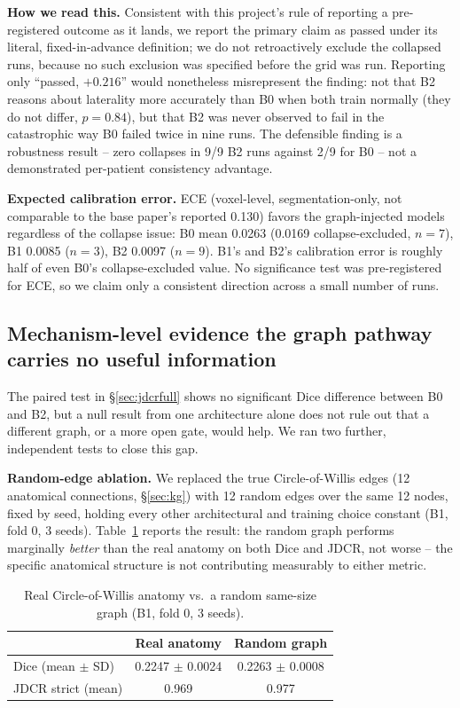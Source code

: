 \documentclass[conference]{IEEEtran}
\begin{document}
\textbf{How we read this.} Consistent with this project's rule of reporting a pre-registered outcome as it lands, we report the primary claim as passed under its literal, fixed-in-advance definition; we do not retroactively exclude the collapsed runs, because no such exclusion was specified before the grid was run. Reporting only ``passed, $+0.216$'' would nonetheless misrepresent the finding: not that B2 reasons about laterality more accurately than B0 when both train normally (they do not differ, $p=0.84$), but that B2 was never observed to fail in the catastrophic way B0 failed twice in nine runs. The defensible finding is a robustness result -- zero collapses in 9/9 B2 runs against 2/9 for B0 -- not a demonstrated per-patient consistency advantage.

\textbf{Expected calibration error.} ECE (voxel-level, segmentation-only, not comparable to the base paper's reported 0.130) favors the graph-injected models regardless of the collapse issue: B0 mean 0.0263 (0.0169 collapse-excluded, $n=7$), B1 0.0085 ($n=3$), B2 0.0097 ($n=9$). B1's and B2's calibration error is roughly half of even B0's collapse-excluded value. No significance test was pre-registered for ECE, so we claim only a consistent direction across a small number of runs.

\subsection{Mechanism-level evidence the graph pathway carries no useful information}
\label{sec:mechanism}

The paired test in \S\ref{sec:jdcrfull} shows no significant Dice difference between B0 and B2, but a null result from one architecture alone does not rule out that a different graph, or a more open gate, would help. We ran two further, independent tests to close this gap.

\textbf{Random-edge ablation.} We replaced the true Circle-of-Willis edges (12 anatomical connections, \S\ref{sec:kg}) with 12 random edges over the same 12 nodes, fixed by seed, holding every other architectural and training choice constant (B1, fold 0, 3 seeds). Table~\ref{tab:randomedge} reports the result: the random graph performs marginally \emph{better} than the real anatomy on both Dice and JDCR, not worse -- the specific anatomical structure is not contributing measurably to either metric.

\begin{table}[t]
\centering
\caption{Real Circle-of-Willis anatomy vs.\ a random same-size graph (B1, fold 0, 3 seeds).}
\label{tab:randomedge}
\begin{tabular}{lcc}
\toprule
& \textbf{Real anatomy} & \textbf{Random graph} \\
\midrule
Dice (mean $\pm$ SD) & 0.2247 $\pm$ 0.0024 & 0.2263 $\pm$ 0.0008 \\
JDCR strict (mean) & 0.969 & 0.977 \\
\bottomrule
\end{tabular}
\end{table}
\end{document}
